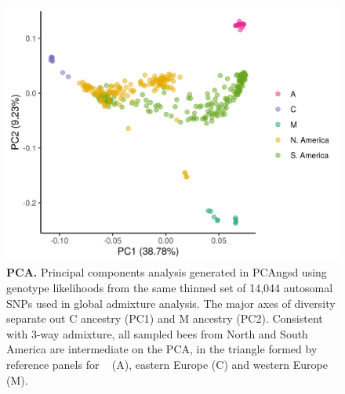 
\begin{figure}[ht]
\includegraphics[width=\textwidth]{chapter1/figures/PCA_12_combined_sept19_byGroup.png}

\caption{ \textbf{PCA.} Principal components analysis generated in PCAngsd using genotype likelihoods from the same thinned set of 14,044 autosomal SNPs used in global admixture analysis. The major axes of diversity separate out C ancestry (PC1) and M ancestry (PC2). Consistent with 3-way admixture, all sampled bees from North and South America are intermediate on the PCA, in the triangle formed by reference panels for  \scutellata\  (A),  eastern Europe (C) and  western Europe (M).}

\label{supp_pca}
\end{figure}

